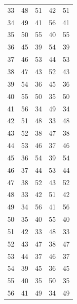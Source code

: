 \begin{longtable}{rrrrr}
33 & 48 & 51 & 42 & 51 \\
34 & 49 & 41 & 56 & 41 \\
35 & 50 & 55 & 40 & 55 \\
36 & 45 & 39 & 54 & 39 \\
37 & 46 & 53 & 44 & 53 \\
38 & 47 & 43 & 52 & 43 \\
39 & 54 & 36 & 45 & 36 \\
40 & 55 & 50 & 35 & 50 \\
41 & 56 & 34 & 49 & 34 \\
42 & 51 & 48 & 33 & 48 \\
43 & 52 & 38 & 47 & 38 \\
44 & 53 & 46 & 37 & 46 \\
45 & 36 & 54 & 39 & 54 \\
46 & 37 & 44 & 53 & 44 \\
47 & 38 & 52 & 43 & 52 \\
48 & 33 & 42 & 51 & 42 \\
49 & 34 & 56 & 41 & 56 \\
50 & 35 & 40 & 55 & 40 \\
51 & 42 & 33 & 48 & 33 \\
52 & 43 & 47 & 38 & 47 \\
53 & 44 & 37 & 46 & 37 \\
54 & 39 & 45 & 36 & 45 \\
55 & 40 & 35 & 50 & 35 \\
56 & 41 & 49 & 34 & 49 \\
\end{longtable}
